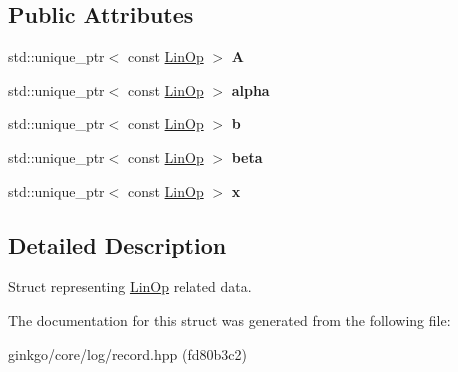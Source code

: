 \subsection*{Public Attributes}
\begin{DoxyCompactItemize}
\item 
\mbox{\label{structgko_1_1log_1_1linop__data_a02a1a3dacdf707cc5b6ee1173aad7aad}} 
std\+::unique\+\_\+ptr$<$ const \hyperlink{classgko_1_1LinOp}{Lin\+Op} $>$ {\bfseries A}
\item 
\mbox{\label{structgko_1_1log_1_1linop__data_ac65bf9ffa7f7d14a86b21d073d21471e}} 
std\+::unique\+\_\+ptr$<$ const \hyperlink{classgko_1_1LinOp}{Lin\+Op} $>$ {\bfseries alpha}
\item 
\mbox{\label{structgko_1_1log_1_1linop__data_aa03f552586f8de9e953057762d6e0b4b}} 
std\+::unique\+\_\+ptr$<$ const \hyperlink{classgko_1_1LinOp}{Lin\+Op} $>$ {\bfseries b}
\item 
\mbox{\label{structgko_1_1log_1_1linop__data_a5c0014fd2c39f067bbcc32e79b458b7b}} 
std\+::unique\+\_\+ptr$<$ const \hyperlink{classgko_1_1LinOp}{Lin\+Op} $>$ {\bfseries beta}
\item 
\mbox{\label{structgko_1_1log_1_1linop__data_a9c7297540351403305fc1633dad9fea6}} 
std\+::unique\+\_\+ptr$<$ const \hyperlink{classgko_1_1LinOp}{Lin\+Op} $>$ {\bfseries x}
\end{DoxyCompactItemize}


\subsection{Detailed Description}
Struct representing \hyperlink{classgko_1_1LinOp}{Lin\+Op} related data. 



The documentation for this struct was generated from the following file\+:\begin{DoxyCompactItemize}
\item 
ginkgo/core/log/record.\+hpp (fd80b3c2)\end{DoxyCompactItemize}
